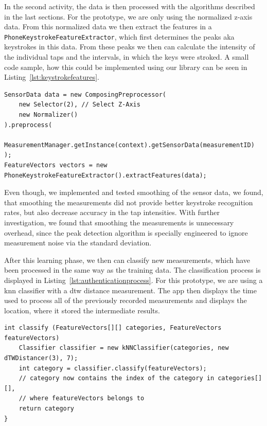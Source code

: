 In the second \gls{activity}, the data is then processed with the algorithms described in the last sections. For the prototype, we are only using the normalized z-axis data. From this normalized data we then extract the features in a \lstinline$PhoneKeystrokeFeatureExtractor$, which first determines the peaks aka keystrokes in this data. From these peaks we then can calculate the intensity of the individual taps and the intervals, in which the keys were stroked. A small code sample, how this could be implemented using our library can be seen in Listing~\ref{lst:keystrokefeatures}.

\begin{lstlisting}[float,
caption={Minimum working example to extract keystroke features},
label={lst:keystrokefeatures}]
SensorData data = new ComposingPreprocessor(
    new Selector(2), // Select Z-Axis
    new Normalizer()
).preprocess(
    MeasurementManager.getInstance(context).getSensorData(measurementID)
);
FeatureVectors vectors = new PhoneKeystrokeFeatureExtractor().extractFeatures(data);
\end{lstlisting}

Even though, we implemented and tested smoothing of the sensor data, we found, that smoothing the measurements did not provide better keystroke recognition rates, but also decrease accuracy in the tap intensities. With further investigation, we found that smoothing the measurements is unnecessary overhead, since the peak detection algorithm is specially engineered to ignore measurement noise via the standard deviation.

After this learning phase, we then can classify new measurements, which have been processed in the same way as the training data. The classification process is displayed in Listing~\ref{lst:authenticationprocess}. For this prototype, we are using a \gls{knn} classifier with a \gls{dtw} distance measurement. The \gls{app} then displays the time used to process all of the previously recorded measurements and displays the location, where it stored the intermediate results.

\begin{lstlisting}[float,
caption={Minimum working example to classify a given \lstinline$FeatureVectors$ according to previously learened \lstinline$categories$},
label={lst:authenticationprocess}]
int classify (FeatureVectors[][] categories, FeatureVectors featureVectors)
    Classifier classifier = new kNNClassifier(categories, new dTWDistancer(3), 7);
    int category = classifier.classify(featureVectors);
    // category now contains the index of the category in categories[][], 
    // where featureVectors belongs to
    return category
}
\end{lstlisting}

